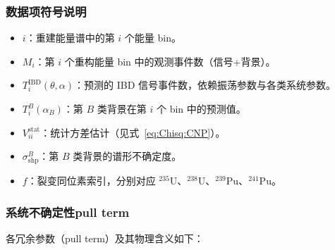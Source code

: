 \subsubsection*{数据项符号说明}

\begin{itemize}
  \item $i$：重建能量谱中的第 $i$ 个能量 bin。
  \item $M_i$：第 $i$ 个重构能量 bin 中的观测事件数（信号+背景）。
  \item $T_i^{\mathrm{IBD}}(\theta,\alpha)$：预测的 IBD 信号事件数，依赖振荡参数与各类系统参数。
  \item $T_i^{B}(\alpha_B)$：第 $B$ 类背景在第 $i$ 个 bin 中的预测值。
  \item $V_{ii}^{\mathrm{stat}}$：统计方差估计（见式~\eqref{eq:Chisq:CNP}）。
  \item $\sigma_{\mathrm{shp}}^B$：第 $B$ 类背景的谱形不确定度。
  \item $f$：裂变同位素索引，分别对应 $^{235}$U、$^{238}$U、$^{239}$Pu、$^{241}$Pu。
\end{itemize}

\subsubsection*{系统不确定性pull term}

各冗余参数（pull term）及其物理含义如下：


